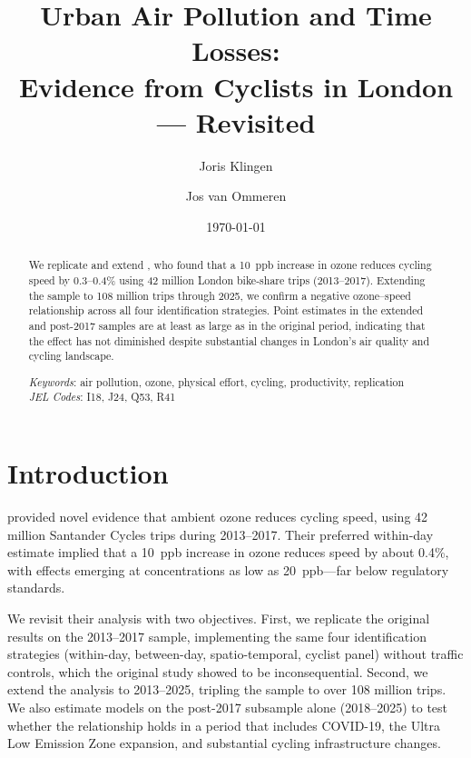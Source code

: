 \documentclass[12pt]{article}
\title{Urban Air Pollution and Time Losses: \\
Evidence from Cyclists in London --- Revisited}
\author{Joris Klingen \and Jos van Ommeren}
\date{\today}
\begin{document}
\maketitle

\begin{abstract}
We replicate and extend \citet{klingen2020urban}, who found that a 10~ppb increase in ozone reduces cycling speed by 0.3--0.4\% using 42 million London bike-share trips (2013--2017). Extending the sample to 108 million trips through 2025, we confirm a negative ozone--speed relationship across all four identification strategies. Point estimates in the extended and post-2017 samples are at least as large as in the original period, indicating that the effect has not diminished despite substantial changes in London's air quality and cycling landscape.

\medskip
\noindent \textit{Keywords}: air pollution, ozone, physical effort, cycling, productivity, replication \\
\noindent \textit{JEL Codes}: I18, J24, Q53, R41
\end{abstract}

\newpage

\section{Introduction} \label{sec:intro}

\citet{klingen2020urban} provided novel evidence that ambient ozone reduces cycling speed, using 42 million Santander Cycles trips during 2013--2017. Their preferred within-day estimate implied that a 10~ppb increase in ozone reduces speed by about 0.4\%, with effects emerging at concentrations as low as 20~ppb---far below regulatory standards.

We revisit their analysis with two objectives. First, we replicate the original results on the 2013--2017 sample, implementing the same four identification strategies (within-day, between-day, spatio-temporal, cyclist panel) without traffic controls, which the original study showed to be inconsequential. Second, we extend the analysis to 2013--2025, tripling the sample to over 108 million trips. We also estimate models on the post-2017 subsample alone (2018--2025) to test whether the relationship holds in a period that includes COVID-19, the Ultra Low Emission Zone expansion, and substantial cycling infrastructure changes.
\end{document}
